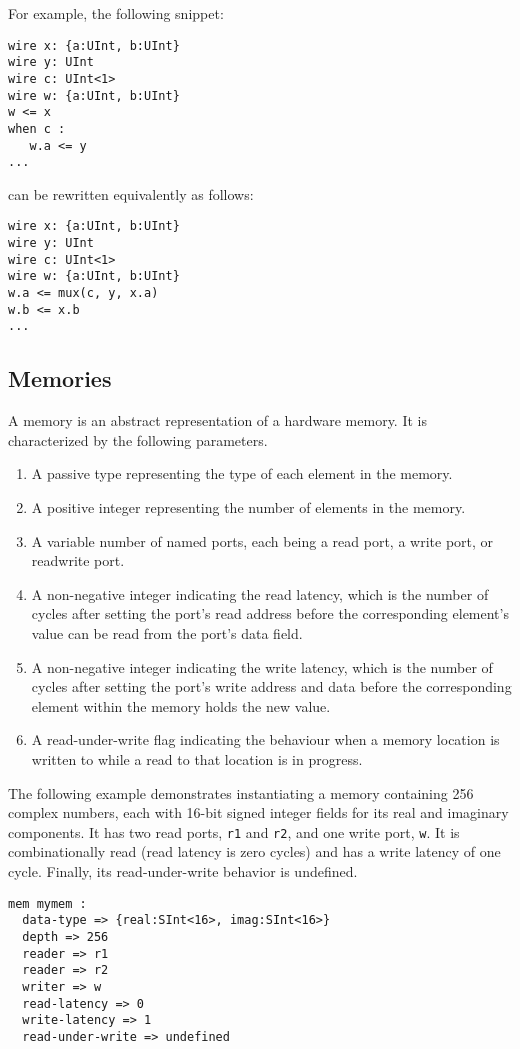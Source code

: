 \documentclass[12pt]{article}
\begin{document}
For example, the following snippet:
\begin{verbatim}
wire x: {a:UInt, b:UInt}
wire y: UInt
wire c: UInt<1>
wire w: {a:UInt, b:UInt}
w <= x
when c :
   w.a <= y
...   
\end{verbatim}
can be rewritten equivalently as follows:
\begin{verbatim}
wire x: {a:UInt, b:UInt}
wire y: UInt
wire c: UInt<1>
wire w: {a:UInt, b:UInt}
w.a <= mux(c, y, x.a)
w.b <= x.b
...
\end{verbatim}

\subsection{Memories}
A memory is an abstract representation of a hardware memory. It is characterized by the following parameters.
\begin{enumerate}
\item A passive type representing the type of each element in the memory.
\item A positive integer representing the number of elements in the memory.
\item A variable number of named ports, each being a read port, a write port, or readwrite port.
\item A non-negative integer indicating the read latency, which is the number of cycles after setting the port's read address before the corresponding element's value can be read from the port's data field.
\item A non-negative integer indicating the write latency, which is the number of cycles after setting the port's write address and data before the corresponding element within the memory holds the new value.
\item A read-under-write flag indicating the behaviour when a memory location is written to while a read to that location is in progress.
\end{enumerate}

The following example demonstrates instantiating a memory containing 256 complex numbers, each with 16-bit signed integer fields for its real and imaginary components. It has two read ports, \verb|r1| and \verb|r2|, and one write port, \verb|w|. It is combinationally read (read latency is zero cycles) and has a write latency of one cycle. Finally, its read-under-write behavior is undefined.
\begin{verbatim}
mem mymem :
  data-type => {real:SInt<16>, imag:SInt<16>}
  depth => 256
  reader => r1
  reader => r2
  writer => w
  read-latency => 0
  write-latency => 1
  read-under-write => undefined
\end{verbatim}
\end{document}
